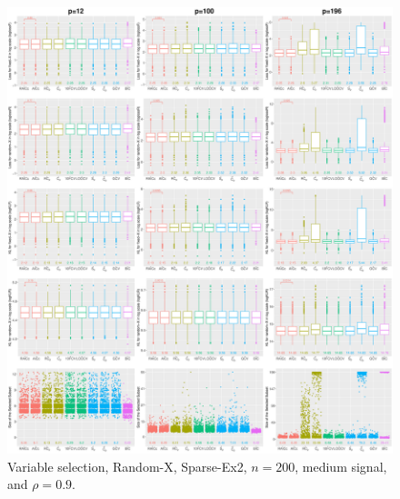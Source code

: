 \begin{figure}[!ht]
\centering
\includegraphics[width=\textwidth]{figures/supplement/randomx/subset_selection/Sparse-Ex2_n200_msnr_rho09.eps}
\caption{Variable selection, Random-X, Sparse-Ex2, $n=200$, medium signal, and $\rho=0.9$.}
\end{figure}
\clearpage

